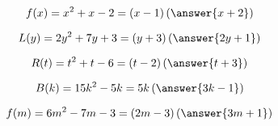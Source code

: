 \documentclass{ximera}
\author{Lee Wayand}
\begin{document}
\begin{example}








\begin{question}


\[
f(x) = x^2 + x - 2 = (x-1) \left( \answer{x+2} \right)
\]

\end{question}





\begin{question}


\[
L(y) = 2y^2 + 7y + 3 = (y+3) \left( \answer{2y+1} \right)
\]

\end{question}





\begin{question}


\[
R(t) = t^2 + t - 6 = (t-2) \left( \answer{t+3} \right)
\]

\end{question}





\begin{question}


\[
B(k) = 15k^2 - 5k = 5k \left( \answer{3k - 1} \right)
\]

\end{question}








\begin{question}


\[
f(m) = 6m^2 -7m - 3 = (2m - 3) \left( \answer{3m + 1} \right)
\]

\end{question}












\end{example}
\end{document}
